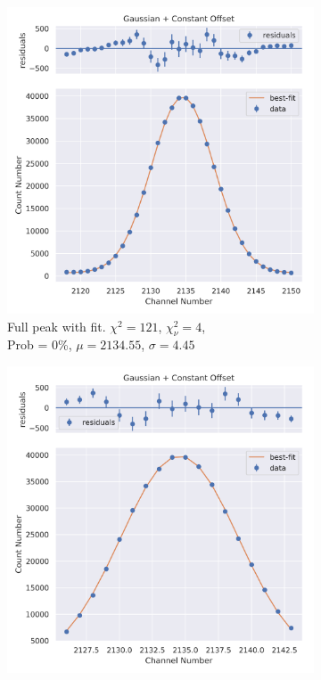 \documentclass[11pt,a4paper]{article}
\begin{document}
\begin{figure}[H]
  \centering
  \begin{subfigure}{.5\linewidth}
    \centering
    \includegraphics[width=\linewidth]{./Images/Barium133/Gauss/Gauss_5_Full.png}
    \caption{Full peak with fit. $\chi^2 = 121$, $\chi^2_\nu = 4$, \\ Prob = 0\%, $\mu = 2134.55$, $\sigma = 4.45$}
  \end{subfigure}%
  \begin{subfigure}{.5\linewidth}
    \centering
    \includegraphics[width=\linewidth]{./Images/Barium133/Gauss/Gauss_5_Zoom.png}

\end{subfigure}
\end{figure}
\end{document}
